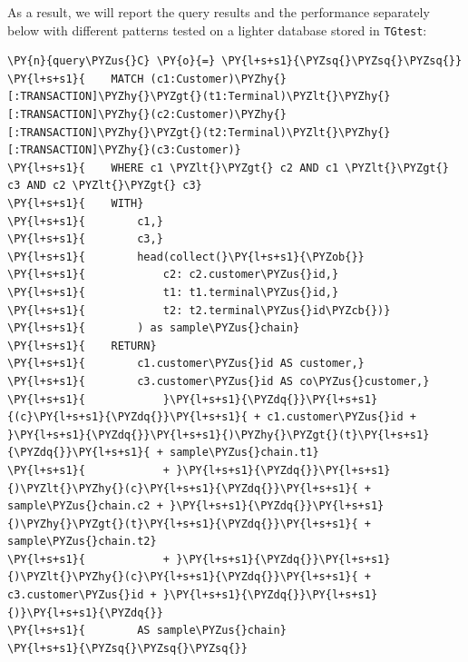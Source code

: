 As a result, we will report the query results and the performance
separately below with different patterns tested on a lighter database
stored in \texttt{TGtest}:

    \begin{tcolorbox}[breakable, size=fbox, boxrule=1pt, pad at break*=1mm,colback=cellbackground, colframe=cellborder]
\begin{Verbatim}[commandchars=\\\{\}]
\PY{n}{query\PYZus{}C} \PY{o}{=} \PY{l+s+s1}{\PYZsq{}\PYZsq{}\PYZsq{}}
\PY{l+s+s1}{    MATCH (c1:Customer)\PYZhy{}[:TRANSACTION]\PYZhy{}\PYZgt{}(t1:Terminal)\PYZlt{}\PYZhy{}[:TRANSACTION]\PYZhy{}(c2:Customer)\PYZhy{}[:TRANSACTION]\PYZhy{}\PYZgt{}(t2:Terminal)\PYZlt{}\PYZhy{}[:TRANSACTION]\PYZhy{}(c3:Customer)}
\PY{l+s+s1}{    WHERE c1 \PYZlt{}\PYZgt{} c2 AND c1 \PYZlt{}\PYZgt{} c3 AND c2 \PYZlt{}\PYZgt{} c3}
\PY{l+s+s1}{    WITH}
\PY{l+s+s1}{        c1,}
\PY{l+s+s1}{        c3,}
\PY{l+s+s1}{        head(collect(}\PY{l+s+s1}{\PYZob{}}
\PY{l+s+s1}{            c2: c2.customer\PYZus{}id,}
\PY{l+s+s1}{            t1: t1.terminal\PYZus{}id,}
\PY{l+s+s1}{            t2: t2.terminal\PYZus{}id\PYZcb{})}
\PY{l+s+s1}{        ) as sample\PYZus{}chain}
\PY{l+s+s1}{    RETURN}
\PY{l+s+s1}{        c1.customer\PYZus{}id AS customer,}
\PY{l+s+s1}{        c3.customer\PYZus{}id AS co\PYZus{}customer,}
\PY{l+s+s1}{            }\PY{l+s+s1}{\PYZdq{}}\PY{l+s+s1}{(c}\PY{l+s+s1}{\PYZdq{}}\PY{l+s+s1}{ + c1.customer\PYZus{}id + }\PY{l+s+s1}{\PYZdq{}}\PY{l+s+s1}{)\PYZhy{}\PYZgt{}(t}\PY{l+s+s1}{\PYZdq{}}\PY{l+s+s1}{ + sample\PYZus{}chain.t1}
\PY{l+s+s1}{            + }\PY{l+s+s1}{\PYZdq{}}\PY{l+s+s1}{)\PYZlt{}\PYZhy{}(c}\PY{l+s+s1}{\PYZdq{}}\PY{l+s+s1}{ + sample\PYZus{}chain.c2 + }\PY{l+s+s1}{\PYZdq{}}\PY{l+s+s1}{)\PYZhy{}\PYZgt{}(t}\PY{l+s+s1}{\PYZdq{}}\PY{l+s+s1}{ + sample\PYZus{}chain.t2}
\PY{l+s+s1}{            + }\PY{l+s+s1}{\PYZdq{}}\PY{l+s+s1}{)\PYZlt{}\PYZhy{}(c}\PY{l+s+s1}{\PYZdq{}}\PY{l+s+s1}{ + c3.customer\PYZus{}id + }\PY{l+s+s1}{\PYZdq{}}\PY{l+s+s1}{)}\PY{l+s+s1}{\PYZdq{}}
\PY{l+s+s1}{        AS sample\PYZus{}chain}
\PY{l+s+s1}{\PYZsq{}\PYZsq{}\PYZsq{}}
\end{Verbatim}
\end{tcolorbox}


